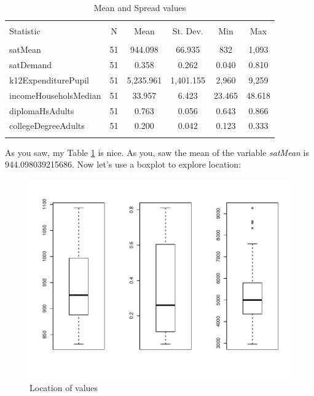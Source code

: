 \documentclass[11pt]{article}
\begin{document}
\begin{table}[!htbp] \centering 
  \caption{Mean and Spread values} 
  \label{measures} 
\begin{tabular}{@{\extracolsep{5pt}}lccccc} 
\\[-1.8ex]\hline 
\hline \\[-1.8ex] 
Statistic & \multicolumn{1}{c}{N} & \multicolumn{1}{c}{Mean} & \multicolumn{1}{c}{St. Dev.} & \multicolumn{1}{c}{Min} & \multicolumn{1}{c}{Max} \\ 
\hline \\[-1.8ex] 
satMean & 51 & 944.098 & 66.935 & 832 & 1,093 \\ 
satDemand & 51 & 0.358 & 0.262 & 0.040 & 0.810 \\ 
k12ExpenditurePupil & 51 & 5,235.961 & 1,401.155 & 2,960 & 9,259 \\ 
incomeHouseholsMedian & 51 & 33.957 & 6.423 & 23.465 & 48.618 \\ 
diplomaHsAdults & 51 & 0.763 & 0.056 & 0.643 & 0.866 \\ 
collegeDegreeAdults & 51 & 0.200 & 0.042 & 0.123 & 0.333 \\ 
\hline \\[-1.8ex] 
\end{tabular} 
\end{table} 
As you saw, my Table \ref{measures} is nice. As you, saw the mean of the variable \emph{satMean} is 944.098039215686. Now let's use a boxplot to explore location:


\begin{figure}[h]
\centering
\includegraphics{PaperInR_4-location}
\caption{Location of values}
\label{plot_boxplots}
\end{figure}
\end{document}
